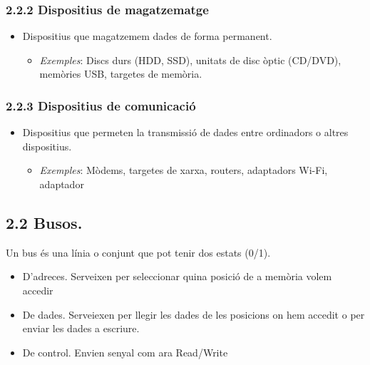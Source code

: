 \documentclass[
  12 pt,
  a4paper,
]{article}
\providecommand{\tightlist}{%
  \setlength{\itemsep}{0pt}\setlength{\parskip}{0pt}}
\begin{document}
\subsubsection{2.2.2 Dispositius de
magatzematge}\label{dispositius-de-magatzematge}

\begin{itemize}
\tightlist
\item
  Dispositius que magatzemem dades de forma permanent.

  \begin{itemize}
  \tightlist
  \item
    \emph{Exemples}: Discs durs (HDD, SSD), unitats de disc òptic
    (CD/DVD), memòries USB, targetes de memòria.
  \end{itemize}
\end{itemize}

\subsubsection{2.2.3 Dispositius de
comunicació}\label{dispositius-de-comunicaciuxf3}

\begin{itemize}
\tightlist
\item
  Dispositius que permeten la transmissió de dades entre ordinadors o
  altres dispositius.

  \begin{itemize}
  \tightlist
  \item
    \emph{Exemples}: Mòdems, targetes de xarxa, routers, adaptadors
    Wi-Fi, adaptador
  \end{itemize}
\end{itemize}

\subsection{2.2 Busos.}\label{busos.}

Un bus és una línia o conjunt que pot tenir dos estats (0/1).

\begin{itemize}
\tightlist
\item
  D'adreces. Serveixen per seleccionar quina posició de a memòria volem
  accedir
\item
  De dades. Serveiexen per llegir les dades de les posicions on hem
  accedit o per enviar les dades a escriure.
\item
  De control. Envien senyal com ara Read/Write
\end{itemize}
\end{document}
